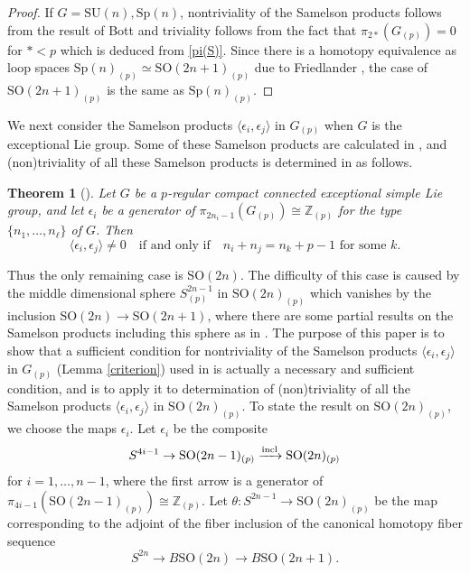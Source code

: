 \documentclass[12pt]{amsart}
\numberwithin{equation}{section}
\newtheorem{theorem}{Theorem}[section]
\theoremstyle{definition}
\theoremstyle{remark}
\begin{document}
\begin{proof}
If $G=\mathrm{SU}(n),\mathrm{Sp}(n)$, nontriviality of the Samelson products follows from the result of Bott \cite{B} and triviality follows from the fact that $\pi_{2*}(G_{(p)})=0$ for $*<p$ which is deduced from \eqref{pi(S)}. Since there is a homotopy equivalence as loop spaces $\mathrm{Sp}(n)_{(p)}\simeq{\mathrm{SO}}(2n+1)_{(p)}$ due to Friedlander \cite{F}, the case of ${\mathrm{SO}}(2n+1)_{(p)}$ is the same as $\mathrm{Sp}(n)_{(p)}$.
\end{proof}

We next consider the Samelson products $\langle\epsilon_i,\epsilon_j\rangle$ in $G_{(p)}$ when $G$ is the exceptional Lie group. Some of these Samelson products are calculated in \cite{HK2,KK}, and (non)triviality of all these Samelson products is determined in \cite{HKO} as follows. 

\begin{theorem}
[\cite{HKO}]
\label{HKO}
Let $G$ be a $p$-regular compact connected exceptional simple Lie group, and let $\epsilon_i$ be a generator of $\pi_{2n_i-1}(G_{(p)})\cong{\mathbb{Z}}_{(p)}$ for the type $\{n_1,\ldots,n_\ell\}$ of $G$. Then
$$\langle\epsilon_i,\epsilon_j\rangle\ne 0\quad\text{if and only if}\quad n_i+n_j=n_k+p-1\text{ for some }k.$$
\end{theorem}

Thus the only remaining case is ${\mathrm{SO}}(2n)$. The difficulty of this case is caused by the middle dimensional sphere $S^{2n-1}_{(p)}$ in ${\mathrm{SO}}(2n)_{(p)}$ which vanishes by the inclusion ${\mathrm{SO}}(2n)\to{\mathrm{SO}}(2n+1)$, where there are some partial results on the Samelson products including this sphere as in \cite{Ma,HK1}. The purpose of this paper is to show that a sufficient condition for nontriviality of the Samelson products $\langle\epsilon_i,\epsilon_j\rangle$ in $G_{(p)}$ (Lemma \ref{criterion}) used in \cite{KO,HK1,HK2,HKO} is actually a necessary and sufficient condition, and is to apply it to determination of (non)triviality of all the Samelson products $\langle\epsilon_i,\epsilon_j\rangle$ in ${\mathrm{SO}}(2n)_{(p)}$. To state the result on ${\mathrm{SO}}(2n)_{(p)}$, we choose the maps $\epsilon_i$. Let $\epsilon_i$ be the composite 
$$S^{4i-1}\to{\mathrm{SO}}(2n-1)_{(p)}\xrightarrow{\rm incl}{\mathrm{SO}}(2n)_{(p)}$$ 
for $i=1,\ldots,n-1$, where the first arrow is a generator of $\pi_{4i-1}({\mathrm{SO}}(2n-1)_{(p)})\cong{\mathbb{Z}}_{(p)}$. Let $\theta:S^{2n-1}\to{\mathrm{SO}}(2n)_{(p)}$ be the map corresponding to the adjoint of the fiber inclusion of the canonical homotopy fiber sequence
$$S^{2n}\to B{\mathrm{SO}}(2n)\to B{\mathrm{SO}}(2n+1).$$
\end{document}
